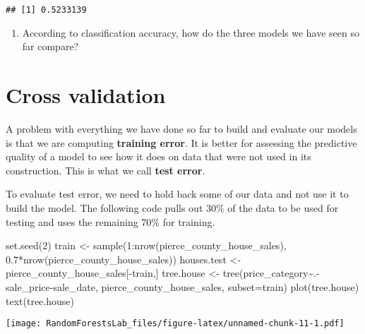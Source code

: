 \documentclass[
]{article}
\newenvironment{Shaded}{\begin{snugshade}}{\end{snugshade}}
\newcommand{\AttributeTok}[1]{\textcolor[rgb]{0.77,0.63,0.00}{#1}}
\newcommand{\DecValTok}[1]{\textcolor[rgb]{0.00,0.00,0.81}{#1}}
\newcommand{\FloatTok}[1]{\textcolor[rgb]{0.00,0.00,0.81}{#1}}
\newcommand{\FunctionTok}[1]{\textcolor[rgb]{0.00,0.00,0.00}{#1}}
\newcommand{\NormalTok}[1]{#1}
\newcommand{\OtherTok}[1]{\textcolor[rgb]{0.56,0.35,0.01}{#1}}
\newcommand{\SpecialCharTok}[1]{\textcolor[rgb]{0.00,0.00,0.00}{#1}}
\providecommand{\tightlist}{%
  \setlength{\itemsep}{0pt}\setlength{\parskip}{0pt}}
\begin{document}
\begin{verbatim}
## [1] 0.5233139
\end{verbatim}

\begin{enumerate}
\def\labelenumi{(\arabic{enumi})}
\setcounter{enumi}{3}
\tightlist
\item
  According to classification accuracy, how do the three models we have
  seen so far compare?
\end{enumerate}

\hypertarget{cross-validation}{%
\section{Cross validation}\label{cross-validation}}

A problem with everything we have done so far to build and evaluate our
models is that we are computing \textbf{training error}. It is better
for assessing the predictive quality of a model to see how it does on
data that were not used in its construction. This is what we call
\textbf{test error}.

To evaluate test error, we need to hold back some of our data and not
use it to build the model. The following code pulls out 30\% of the data
to be used for testing and uses the remaining 70\% for training.

\begin{Shaded}
\begin{Highlighting}[]
\FunctionTok{set.seed}\NormalTok{(}\DecValTok{2}\NormalTok{)}
\NormalTok{train }\OtherTok{\textless{}{-}} \FunctionTok{sample}\NormalTok{(}\DecValTok{1}\SpecialCharTok{:}\FunctionTok{nrow}\NormalTok{(pierce\_county\_house\_sales), }\FloatTok{0.7}\SpecialCharTok{*}\FunctionTok{nrow}\NormalTok{(pierce\_county\_house\_sales))}
\NormalTok{houses.test }\OtherTok{\textless{}{-}}\NormalTok{ pierce\_county\_house\_sales[}\SpecialCharTok{{-}}\NormalTok{train,]}
\NormalTok{tree.house }\OtherTok{\textless{}{-}} \FunctionTok{tree}\NormalTok{(price\_category}\SpecialCharTok{\textasciitilde{}}\NormalTok{.}\SpecialCharTok{{-}}\NormalTok{sale\_price}\SpecialCharTok{{-}}\NormalTok{sale\_date, pierce\_county\_house\_sales, }\AttributeTok{subset=}\NormalTok{train)}
\FunctionTok{plot}\NormalTok{(tree.house)}
\FunctionTok{text}\NormalTok{(tree.house)}
\end{Highlighting}
\end{Shaded}

\texttt{[image: RandomForestsLab\_files/figure-latex/unnamed-chunk-11-1.pdf]}
\end{document}
